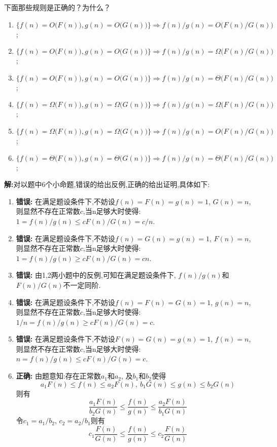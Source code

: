 \begin{problem}[习题1.5]
下面那些规则是正确的？为什么？
\begin{enumerate}
\item $\big\{f(n)=O\big(F(n)\big), g(n)=O\big(G(n)\big)\big\}\Rightarrow f(n)/g(n)=O\big(F(n)/G(n)\big)$;
\item $\big\{f(n)=O\big(F(n)\big), g(n)=O\big(G(n)\big)\big\}\Rightarrow f(n)/g(n)=\Omega\big(F(n)/G(n)\big)$;
\item $\big\{f(n)=O\big(F(n)\big), g(n)=O\big(G(n)\big)\big\}\Rightarrow f(n)/g(n)=\Theta\big(F(n)/G(n)\big)$;
\item $\big\{f(n)=\Omega\big(F(n)\big), g(n)=\Omega\big(G(n)\big)\big\}\Rightarrow f(n)/g(n)=\Omega\big(F(n)/G(n)\big)$;
\item $\big\{f(n)=\Omega\big(F(n)\big), g(n)=\Omega\big(G(n)\big)\big\}\Rightarrow f(n)/g(n)=O\big(F(n)/G(n)\big)$;
\item $\big\{f(n)=\Theta\big(F(n)\big), g(n)=\Theta\big(G(n)\big)\big\}\Rightarrow f(n)/g(n)=\Theta\big(F(n)/G(n)\big)$;
\end{enumerate}
\end{problem}

\begin{solution}
\textbf{解:}对以题中6个小命题,错误的给出反例,正确的给出证明,具体如下:

\begin{enumerate}
\item \textbf{错误:} 在满足题设条件下,不妨设$f(n) = F(n) = g(n) = 1$, $G(n) = n$,
则显然不存在正常数$c$,当n足够大时使得:$1 = f(n)/g(n)\leq c F(n)/G(n) = c/n$.

\item \textbf{错误:} 在满足题设条件下,不妨设$f(n) = G(n) = g(n) = 1$, $F(n) = n$,
则显然不存在正常数$c$,当n足够大时使得:$1 = f(n)/g(n)\geq c F(n)/G(n) = cn$.

\item \textbf{错误:} 由1,2两小题中的反例,可知在满足题设条件下, $f(n)/g(n)$和$F(n)/G(n)$不一定同阶.

\item \textbf{错误:} 在满足题设条件下,不妨设$f(n) = F(n) = G(n) = 1$, $g(n) = n$,
则显然不存在正常数$c$,当n足够大时使得:$1/n = f(n)/g(n)\geq c F(n)/G(n) = c$.

\item \textbf{错误:} 在满足题设条件下,不妨设$F(n) = G(n) = g(n) = 1$, $f(n) = n$,
则显然不存在正常数$c$,当n足够大时使得:$ n = f(n)/g(n)\leq c F(n)/G(n) = c$.

\item \textbf{正确:} 由题意知:存在正常数$a_1$和$a_2$, 及$b_1$和$b_2$使得
\[
a_1F(n)\leq f(n) \leq a_2F(n), {~} b_1G(n)\leq g(n) \leq b_2G(n)
\]
则有
\[
\frac{a_1F(n)}{b_2G(n)}\leq \frac{f(n)}{g(n)} \leq \frac{a_2F(n)}{b_1G(n)}
\]
令$c_1 = a_1/b_2$, $c_2 = a_2/b_1$则有
\[
c_1\frac{F(n)}{G(n)}\leq \frac{f(n)}{g(n)} \leq c_2\frac{F(n)}{G(n)}
\]
\end{enumerate}
\end{solution}
